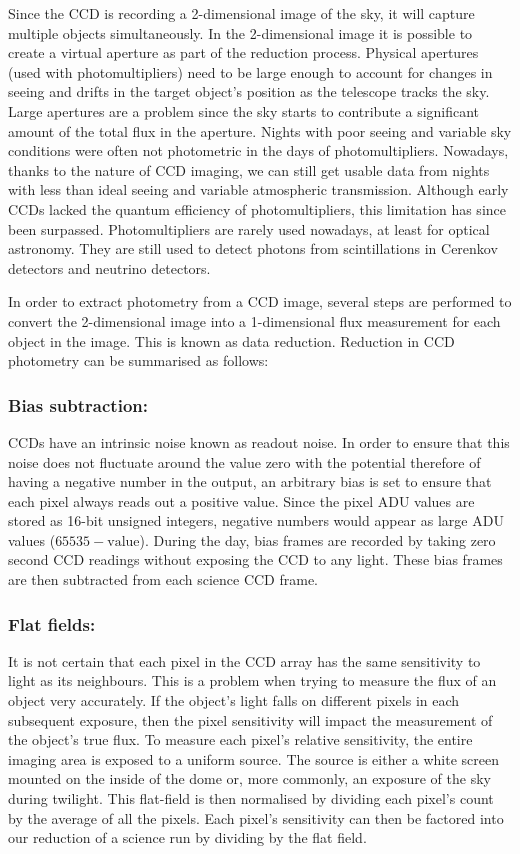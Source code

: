 Since the CCD is recording a 2-dimensional image of the sky, it will capture multiple objects simultaneously. In the 2-dimensional image it is possible to create a virtual aperture as part of the reduction process. Physical apertures (used with photomultipliers) need to be large enough to account for changes in seeing and drifts in the target object's position as the telescope tracks the sky. Large apertures are a problem since the sky starts to contribute a significant amount of the total flux in the aperture. Nights with poor seeing and variable sky conditions were often not photometric in the days of photomultipliers. Nowadays, thanks to the nature of CCD imaging, we can still get usable data from nights with less than ideal seeing and variable atmospheric transmission.  Although early CCDs lacked the quantum efficiency of photomultipliers, this limitation has since been surpassed. Photomultipliers are rarely used nowadays, at least for optical astronomy. They are still used to detect photons from scintillations in Cerenkov detectors and neutrino detectors.  

In order to extract photometry from a CCD image, several steps are performed to convert the 2-dimensional image into a 1-dimensional flux measurement for each object in the image. This is known as data reduction. Reduction in CCD photometry can be summarised as follows: 

\subsubsection{Bias subtraction:}
CCDs have an intrinsic noise known as readout noise. In order to ensure that this noise does not fluctuate around the value zero with the potential therefore of having a negative number in the output, an arbitrary bias is set to ensure that each pixel always reads out a positive value. Since the pixel ADU values are stored as 16-bit unsigned integers, negative numbers would appear as large ADU values ($65535 - \mbox{value}$). During the day, bias frames are recorded by taking zero second CCD readings without exposing the CCD to any light. These bias frames are then subtracted from each science CCD frame. 

\subsubsection{Flat fields:}
It is not certain that each pixel in the CCD array has the same sensitivity to light as its neighbours. This is a problem when trying to measure the flux of an object very accurately. If the object's light falls on different pixels in each subsequent exposure, then the pixel sensitivity will impact the measurement of the object's true flux. To measure each pixel's relative sensitivity, the entire imaging area is exposed to a uniform source. The source is either a white screen mounted on the inside of the dome or, more commonly, an exposure of the sky during twilight. This flat-field is then normalised by dividing each pixel's count by the average of all the pixels. Each pixel's sensitivity can then be factored into our reduction of a science run by dividing by the flat field. 

